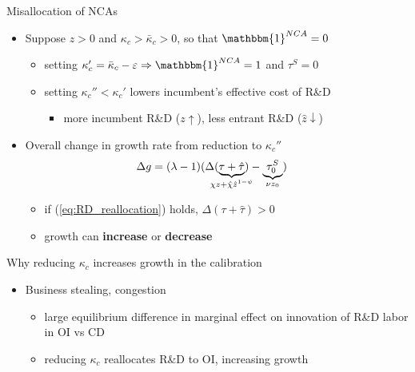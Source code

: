 \documentclass[english,usenames,dvipsnames]{beamer}
\begin{document}
\begin{frame}{Misallocation of NCAs}\label{misallocation_of_nca}
	\hyperlink{efficiency}{} 
	\begin{itemize}
		\item <+-> Suppose $z > 0$ and $\kappa_c > \bar{\kappa}_c > 0$, so that $\mathbbm{1}^{NCA} = 0$ 
		\begin{itemize}
			\item setting $\kappa_c' = \bar{\kappa}_c - \varepsilon \Rightarrow \mathbbm{1}^{NCA} = 1$ and $\tau^S = 0$
			\item setting $\kappa_c'' < \kappa_c'$ lowers incumbent's effective cost of R\&D
			\begin{itemize}
				\item more incumbent R\&D ($z \uparrow$), less entrant R\&D ($\hat{z} \downarrow$)
			\end{itemize}
		\end{itemize}
		\item <+-> Overall change in growth rate from reduction to $\kappa_c''$
		\begin{align*}
		\Delta g  &= (\lambda -1) (\Delta (\underbrace{\tau + \hat{\tau}}_{\mathclap{\chi z + \hat{\chi} \hat{z}^{1-\psi}}}) - \underbrace{\tau^S_0}_{\mathclap{ \nu z_0}})
		\end{align*}
		\begin{itemize}
			\item if (\ref{eq:RD_reallocation}) holds, $\Delta(\tau+ \hat{\tau}) > 0$ 
			\item growth can \alert{\textbf{increase}} or \alert{\textbf{decrease}}  
		\end{itemize}
	\end{itemize}
\end{frame}

\begin{frame}{Why reducing $\kappa_c$ increases growth in the calibration}
	\begin{itemize}
		\item Business stealing, congestion
		\begin{itemize}
			\item large equilibrium difference in marginal effect on innovation of R\&D labor in OI vs CD
			\item reducing $\kappa_c$ reallocates R\&D to OI, increasing growth
		\end{itemize}
	\end{itemize}
\end{frame}
\end{document}
